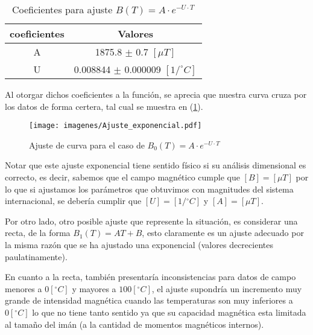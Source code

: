 \begin{table}[!h]
    \centering
    \begin{tabular}{|c|c|}
      \hline
      coeficientes      & Valores \\
      \hline
      A       &   1875.8 $\pm$ 0.7 $[\mu T]$\\
      \hline
      U  & 0.008844 $\pm$ 0.000009 $[1/^\circ C]$\\  
      \hline
    
    \end{tabular}
    \caption{Coeficientes para ajuste $B(T)=A \cdot e^{-U \cdot T} $}
    \label{}
\end{table}

Al otorgar dichos coeficientes a la función, se aprecia que nuestra curva cruza por los datos de forma certera, tal cual se muestra en (\ref{Ajuste_exponencial}).




\begin{figure}
    \centering 
    \texttt{[image: imagenes/Ajuste\_exponencial.pdf]}
    \caption{Ajuste de curva para el caso de $B_0(T)=A \cdot e^{-U \cdot T} $}
    \label{Ajuste_exponencial}
\end{figure}

Notar que este ajuste exponencial tiene sentido físico si su análisis dimensional es correcto, es decir, sabemos que el campo magnético cumple que $[B]=[\mu T]$  por lo que si ajustamos los parámetros que obtuvimos con magnitudes del sistema internacional, se debería cumplir que  $[U]=[1/{^\circ C}]$ y $[A]=[\mu T]$.





%    




Por otro lado, otro posible ajuste que represente la situación, es considerar una recta, de la forma $B_1(T)=AT+B$, esto claramente es un ajuste adecuado por la misma razón que se ha ajustado una exponencial (valores decrecientes paulatinamente).

En cuanto a la recta, también presentaría inconsistencias para datos de campo menores a $0 [^\circ C]$ y mayores a $100 [^\circ C]$, el ajuste supondría un incremento muy grande de intensidad magnética cuando las temperaturas son muy inferiores a $0[^\circ C]$ lo que no tiene tanto sentido ya que su capacidad magnética esta limitada al tamaño del imán (a la cantidad de momentos magnéticos internos).



